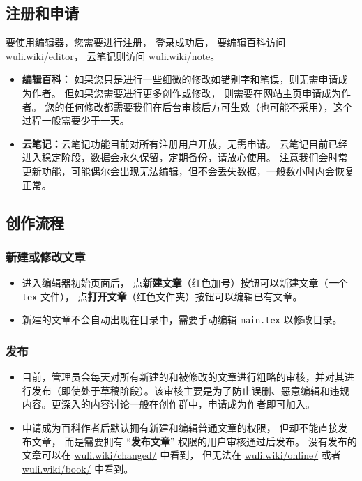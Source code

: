 \subsection{注册和申请}
要使用编辑器，您需要进行\href{https://wuli.wiki/forum}{注册}， 登录成功后， 要编辑百科访问 \href{https://wuli.wiki/editor/}{wuli.wiki/editor}， 云笔记则访问 \href{https://wuli.wiki/note/}{wuli.wiki/note}。
\begin{itemize}
\item \textbf{编辑百科：} 如果您只是进行一些细微的修改如错别字和笔误，则无需申请成为作者。 但如果您需要进行更多创作或修改， 则需要在\href{https://wuli.wiki}{网站主页}申请成为作者。 您的任何修改都需要我们在后台审核后方可生效（也可能不采用），这个过程一般需要少于一天。
\item \textbf{云笔记：}云笔记功能目前对所有注册用户开放，无需申请。 云笔记目前已经进入稳定阶段，数据会永久保留，定期备份，请放心使用。 注意我们会时常更新功能，可能偶尔会出现无法编辑，但不会丢失数据，一般数小时内会恢复正常。
\end{itemize}

\subsection{创作流程}
\subsubsection{新建或修改文章}
\begin{itemize}
\item 进入编辑器初始页面后， 点\textbf{新建文章}（红色加号）按钮可以新建文章（一个 \verb`tex` 文件）， 点\textbf{打开文章}（红色文件夹）按钮可以编辑已有文章。
\item 新建的文章不会自动出现在目录中，需要手动编辑 \verb`main.tex` 以修改目录。
\end{itemize}

\subsubsection{发布}
\begin{itemize}
\item 目前，管理员会每天对所有新建的和被修改的文章进行粗略的审核，并对其进行发布（即使处于草稿阶段）。该审核主要是为了防止误删、恶意编辑和违规内容。更深入的内容讨论一般在创作群中，申请成为作者即可加入。
\item 申请成为百科作者后默认拥有新建和编辑普通文章的权限， 但却不能直接发布文章， 而是需要拥有 “\textbf{发布文章}” 权限的用户审核通过后发布。 没有发布的文章可以在 \href{http://wuli.wiki/changed/}{wuli.wiki/changed/} 中看到， 但无法在 \href{http://wuli.wiki/changed/}{wuli.wiki/online/} 或者 \href{http://wuli.wiki/book/}{wuli.wiki/book/} 中看到。
\end{itemize}

